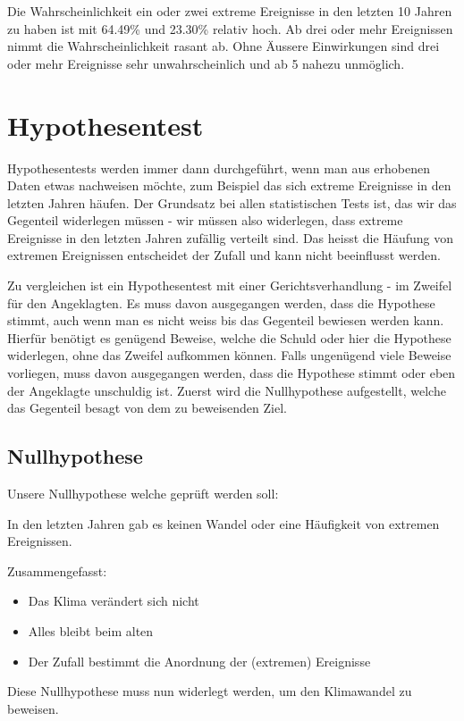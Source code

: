 \begin{refsection}
Die Wahrscheinlichkeit ein oder zwei extreme Ereignisse in den letzten 10 Jahren zu haben ist mit 64.49\% und 23.30\% relativ hoch. Ab drei oder mehr Ereignissen nimmt die Wahrscheinlichkeit rasant ab. Ohne Äussere Einwirkungen sind drei oder mehr Ereignisse sehr unwahrscheinlich und ab 5 nahezu unmöglich.



\section{Hypothesentest}
Hypothesentests werden immer dann durchgeführt, wenn man aus erhobenen Daten etwas nachweisen möchte, zum Beispiel das sich extreme Ereignisse in den letzten Jahren häufen. Der Grundsatz bei allen statistischen Tests ist, das wir das Gegenteil widerlegen müssen - wir müssen also widerlegen, dass extreme Ereignisse in den letzten Jahren zufällig verteilt sind. Das heisst die Häufung von extremen Ereignissen entscheidet der Zufall und kann nicht beeinflusst werden.

Zu vergleichen ist ein Hypothesentest mit einer Gerichtsverhandlung - im Zweifel für den Angeklagten. Es muss davon ausgegangen werden, dass die Hypothese stimmt, auch wenn man es nicht weiss bis das Gegenteil bewiesen werden kann. Hierfür benötigt es genügend Beweise, welche die Schuld oder hier die Hypothese widerlegen, ohne das Zweifel aufkommen können. Falls ungenügend viele Beweise vorliegen, muss davon ausgegangen werden, dass die Hypothese stimmt oder eben der Angeklagte unschuldig ist.
Zuerst wird die Nullhypothese aufgestellt, welche das Gegenteil besagt von dem zu beweisenden Ziel.

\subsection{Nullhypothese}
Unsere Nullhypothese welche geprüft werden soll:

In den letzten Jahren gab es keinen Wandel oder eine Häufigkeit von extremen Ereignissen. 

Zusammengefasst:
\begin{itemize}
\item Das Klima verändert sich nicht
\item Alles bleibt beim alten
\item Der Zufall bestimmt die Anordnung der (extremen) Ereignisse
\end{itemize}

Diese Nullhypothese muss nun widerlegt werden, um den Klimawandel zu beweisen.


\end{refsection}
